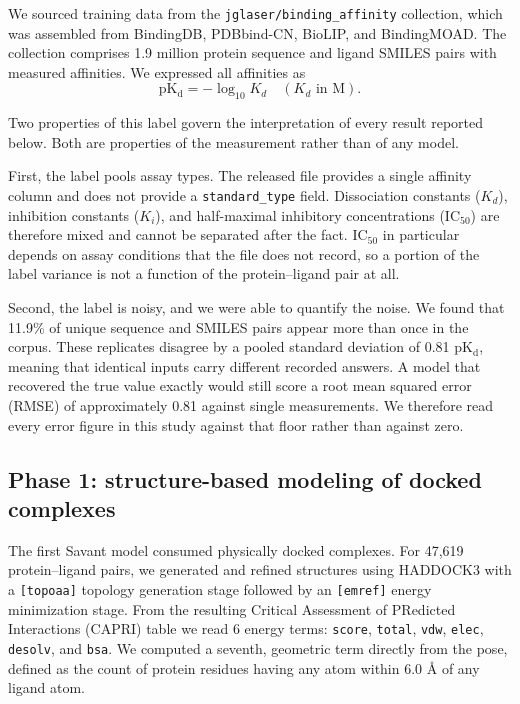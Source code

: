 \documentclass[11pt]{article}
\newcommand{\pkd}{\ensuremath{\mathrm{pK_d}}}
\begin{document}
We sourced training data from the \texttt{jglaser/binding\_affinity}
collection, which was assembled from BindingDB, PDBbind-CN, BioLIP, and
BindingMOAD. The collection comprises 1.9 million protein sequence and ligand
SMILES pairs with measured affinities. We expressed all affinities as
\[
  \pkd = -\log_{10} K_d \quad (K_d \text{ in } \mathrm{M}).
\]

Two properties of this label govern the interpretation of every result reported
below. Both are properties of the measurement rather than of any model.

First, the label pools assay types. The released file provides a single
affinity column and does not provide a \texttt{standard\_type} field.
Dissociation constants ($K_d$), inhibition constants ($K_i$), and half-maximal
inhibitory concentrations (IC$_{50}$) are therefore mixed and cannot be
separated after the fact. IC$_{50}$ in particular depends on assay conditions
that the file does not record, so a portion of the label variance is not a
function of the protein--ligand pair at all.

Second, the label is noisy, and we were able to quantify the noise. We found
that 11.9\% of unique sequence and SMILES pairs appear more than once in the
corpus. These replicates disagree by a pooled standard deviation of 0.81 \pkd,
meaning that identical inputs carry different recorded answers. A model that
recovered the true value exactly would still score a root mean squared error
(RMSE) of approximately 0.81 against single measurements. We therefore read
every error figure in this study against that floor rather than against zero.

\subsection{Phase 1: structure-based modeling of docked complexes}
\label{sec:phase1}

The first Savant model consumed physically docked complexes. For 47,619
protein--ligand pairs, we generated and refined structures using HADDOCK3 with
a \texttt{[topoaa]} topology generation stage followed by an \texttt{[emref]}
energy minimization stage. From the resulting Critical Assessment of PRedicted
Interactions (CAPRI) table we read 6 energy terms: \texttt{score},
\texttt{total}, \texttt{vdw}, \texttt{elec}, \texttt{desolv}, and \texttt{bsa}.
We computed a seventh, geometric term directly from the pose, defined as the
count of protein residues having any atom within 6.0 \AA{} of any ligand atom.
\end{document}
